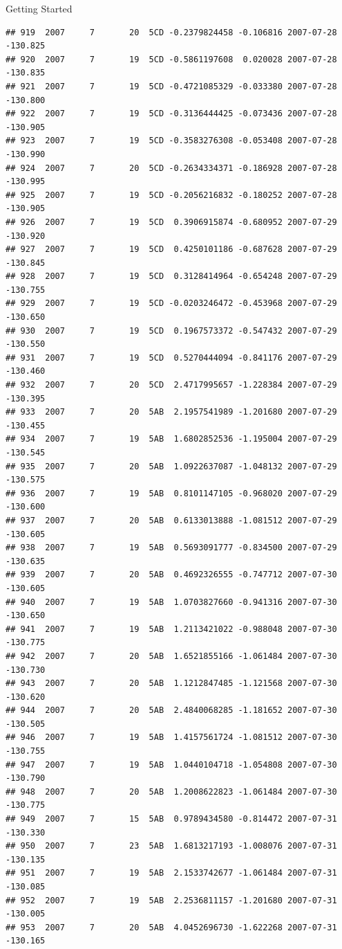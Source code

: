 \documentclass[
  ignorenonframetext,
]{beamer}
\begin{document}
\begin{frame}[fragile]{Getting Started}
\begin{verbatim}
## 919  2007     7       20  5CD -0.2379824458 -0.106816 2007-07-28 -130.825
## 920  2007     7       19  5CD -0.5861197608  0.020028 2007-07-28 -130.835
## 921  2007     7       19  5CD -0.4721085329 -0.033380 2007-07-28 -130.800
## 922  2007     7       19  5CD -0.3136444425 -0.073436 2007-07-28 -130.905
## 923  2007     7       19  5CD -0.3583276308 -0.053408 2007-07-28 -130.990
## 924  2007     7       20  5CD -0.2634334371 -0.186928 2007-07-28 -130.995
## 925  2007     7       19  5CD -0.2056216832 -0.180252 2007-07-28 -130.905
## 926  2007     7       19  5CD  0.3906915874 -0.680952 2007-07-29 -130.920
## 927  2007     7       19  5CD  0.4250101186 -0.687628 2007-07-29 -130.845
## 928  2007     7       19  5CD  0.3128414964 -0.654248 2007-07-29 -130.755
## 929  2007     7       19  5CD -0.0203246472 -0.453968 2007-07-29 -130.650
## 930  2007     7       19  5CD  0.1967573372 -0.547432 2007-07-29 -130.550
## 931  2007     7       19  5CD  0.5270444094 -0.841176 2007-07-29 -130.460
## 932  2007     7       20  5CD  2.4717995657 -1.228384 2007-07-29 -130.395
## 933  2007     7       20  5AB  2.1957541989 -1.201680 2007-07-29 -130.455
## 934  2007     7       19  5AB  1.6802852536 -1.195004 2007-07-29 -130.545
## 935  2007     7       20  5AB  1.0922637087 -1.048132 2007-07-29 -130.575
## 936  2007     7       19  5AB  0.8101147105 -0.968020 2007-07-29 -130.600
## 937  2007     7       20  5AB  0.6133013888 -1.081512 2007-07-29 -130.605
## 938  2007     7       19  5AB  0.5693091777 -0.834500 2007-07-29 -130.635
## 939  2007     7       20  5AB  0.4692326555 -0.747712 2007-07-30 -130.605
## 940  2007     7       19  5AB  1.0703827660 -0.941316 2007-07-30 -130.650
## 941  2007     7       19  5AB  1.2113421022 -0.988048 2007-07-30 -130.775
## 942  2007     7       20  5AB  1.6521855166 -1.061484 2007-07-30 -130.730
## 943  2007     7       20  5AB  1.1212847485 -1.121568 2007-07-30 -130.620
## 944  2007     7       20  5AB  2.4840068285 -1.181652 2007-07-30 -130.505
## 946  2007     7       19  5AB  1.4157561724 -1.081512 2007-07-30 -130.755
## 947  2007     7       19  5AB  1.0440104718 -1.054808 2007-07-30 -130.790
## 948  2007     7       20  5AB  1.2008622823 -1.061484 2007-07-30 -130.775
## 949  2007     7       15  5AB  0.9789434580 -0.814472 2007-07-31 -130.330
## 950  2007     7       23  5AB  1.6813217193 -1.008076 2007-07-31 -130.135
## 951  2007     7       19  5AB  2.1533742677 -1.061484 2007-07-31 -130.085
## 952  2007     7       19  5AB  2.2536811157 -1.201680 2007-07-31 -130.005
## 953  2007     7       20  5AB  4.0452696730 -1.622268 2007-07-31 -130.165

\end{verbatim}
\end{frame}
\end{document}
